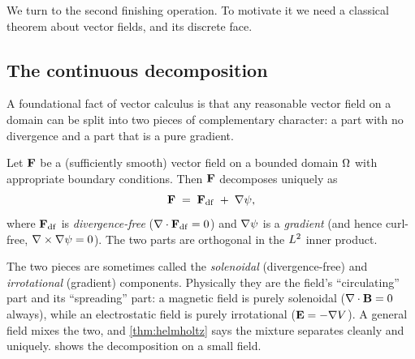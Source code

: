 We turn to the second finishing operation. To motivate it we need a classical
theorem about vector fields, and its discrete face.

\subsection{The continuous decomposition}

A foundational fact of vector calculus is that any reasonable vector field on a
domain can be split into two pieces of complementary character: a part with no
divergence and a part that is a pure gradient.

\begin{theorem}
\label{thm:helmholtz}
Let $\mathbf{F}$ be a (sufficiently smooth) vector field on a bounded domain $\Omega$ with
appropriate boundary conditions. Then $\mathbf{F}$ decomposes uniquely as
\begin{equation}
  \mathbf{F} \;=\; \mathbf{F}_{\mathrm{df}} \;+\; \nabla\psi,
  \label{eq:helmholtz}
\end{equation}
where $\mathbf{F}_{\mathrm{df}}$ is \emph{divergence-free} ($\nabla\cdot\mathbf{F}_{\mathrm{df}}=0$)
and $\nabla\psi$ is a \emph{gradient} (and hence curl-free, $\nabla\times\nabla\psi=0$).
The two parts are orthogonal in the $L^2$ inner product.
\end{theorem}

The two pieces are sometimes called the \emph{solenoidal} (divergence-free) and
\emph{irrotational} (gradient) components. Physically they are the field's
``circulating'' part and its ``spreading'' part: a magnetic field is purely
solenoidal ($\nabla\cdot\mathbf{B}=0$ always), while an electrostatic field is purely
irrotational ($\mathbf{E}=-\nabla V$). A general field mixes the two, and
\cref{thm:helmholtz} says the mixture separates cleanly and uniquely.
 shows the decomposition on a small field.

